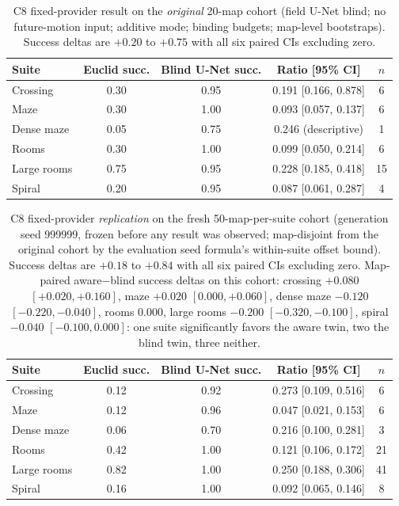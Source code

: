 \documentclass[letterpaper]{article} %
\newcommand{\stage}[1]{\textsc{#1}}
\begin{document}
\begin{table}[h]
\centering
\scriptsize
\setlength{\tabcolsep}{3pt}
\begin{tabular}{@{}lcccc@{}}
\toprule
Suite & Euclid succ. & Blind U-Net succ. & Ratio [95\% CI] & $n$ \\
\midrule
Crossing & 0.30 & 0.95 & 0.191 [0.166, 0.878] & 6 \\
Maze & 0.30 & 1.00 & 0.093 [0.057, 0.137] & 6 \\
Dense maze & 0.05 & 0.75 & 0.246 (descriptive) & 1 \\
Rooms & 0.30 & 1.00 & 0.099 [0.050, 0.214] & 6 \\
Large rooms & 0.75 & 0.95 & 0.228 [0.185, 0.418] & 15 \\
Spiral & 0.20 & 0.95 & 0.087 [0.061, 0.287] & 4 \\
\bottomrule
\end{tabular}
\caption{\stage{C8} fixed-provider result on the \emph{original} 20-map cohort (field U-Net blind; no future-motion input; additive mode; binding budgets; map-level bootstraps). Success deltas are $+0.20$ to $+0.75$ with all six paired CIs excluding zero.}
\label{tab:c8fixed}
\end{table}

\begin{table}[h]
\centering
\scriptsize
\setlength{\tabcolsep}{3pt}
\begin{tabular}{@{}lcccc@{}}
\toprule
Suite & Euclid succ. & Blind U-Net succ. & Ratio [95\% CI] & $n$ \\
\midrule
Crossing & 0.12 & 0.92 & 0.273 [0.109, 0.516] & 6 \\
Maze & 0.12 & 0.96 & 0.047 [0.021, 0.153] & 6 \\
Dense maze & 0.06 & 0.70 & 0.216 [0.100, 0.281] & 3 \\
Rooms & 0.42 & 1.00 & 0.121 [0.106, 0.172] & 21 \\
Large rooms & 0.82 & 1.00 & 0.250 [0.188, 0.306] & 41 \\
Spiral & 0.16 & 1.00 & 0.092 [0.065, 0.146] & 8 \\
\bottomrule
\end{tabular}
\caption{\stage{C8} fixed-provider \emph{replication} on the fresh 50-map-per-suite cohort (generation seed 999999, frozen before any result was observed; map-disjoint from the original cohort by the evaluation seed formula's within-suite offset bound). Success deltas are $+0.18$ to $+0.84$ with all six paired CIs excluding zero. Map-paired aware$-$blind success deltas on this cohort: crossing $+0.080$ $[+0.020,+0.160]$, maze $+0.020$ $[0.000,+0.060]$, dense maze $-0.120$ $[-0.220,-0.040]$, rooms $0.000$, large rooms $-0.200$ $[-0.320,-0.100]$, spiral $-0.040$ $[-0.100,0.000]$: one suite significantly favors the aware twin, two the blind twin, three neither.}
\label{tab:c8fresh}
\end{table}
\end{document}
